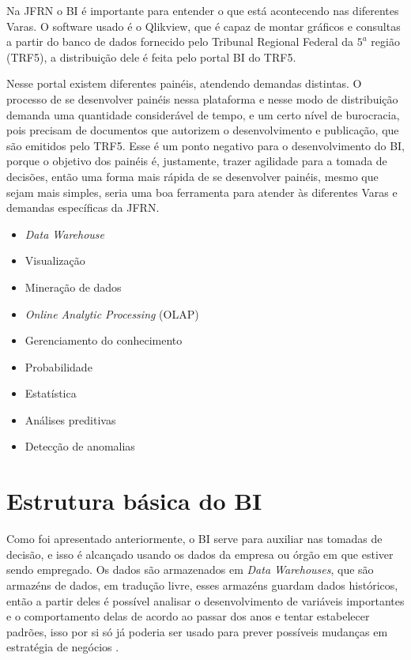Na JFRN o BI é importante para entender o que está acontecendo nas diferentes Varas. O software usado é o Qlikview, que é capaz de montar gráficos e consultas a partir do banco de dados fornecido pelo Tribunal Regional Federal da $5^{a}$ região (TRF5), a distribuição dele é feita pelo portal BI do TRF5.

Nesse portal existem diferentes painéis, atendendo demandas distintas. O processo de se desenvolver painéis nessa plataforma e nesse modo de distribuição demanda uma quantidade considerável de tempo, e um certo nível de burocracia, pois precisam de documentos que autorizem o desenvolvimento e publicação, que são emitidos pelo TRF5. Esse é um ponto negativo para o desenvolvimento do BI, porque o objetivo dos painéis é, justamente, trazer agilidade para a tomada de decisões, então uma forma mais rápida de se desenvolver painéis, mesmo que sejam mais simples, seria uma boa ferramenta para atender às diferentes Varas e demandas específicas da JFRN.



\begin{itemize}
	\item \textit{Data Warehouse}
	\item Visualização
	\item Mineração de dados
	\item \textit{Online Analytic Processing} (OLAP)
	\item Gerenciamento do conhecimento
	\item Probabilidade
	\item Estatística
	\item Análises preditivas
	\item Detecção de anomalias
\end{itemize}

\section{Estrutura básica do BI}

Como foi apresentado anteriormente, o BI serve para auxiliar nas tomadas de decisão, e isso é alcançado usando os dados da empresa ou órgão em que estiver sendo empregado. Os dados são armazenados em \textit{Data Warehouses}, que são armazéns de dados, em tradução livre, esses armazéns guardam dados históricos, então a partir deles é possível analisar o desenvolvimento de variáveis importantes e o comportamento delas de acordo ao passar dos anos e tentar estabelecer padrões, isso por si só já poderia ser usado para prever possíveis mudanças em estratégia de negócios \cite{negash1}.

